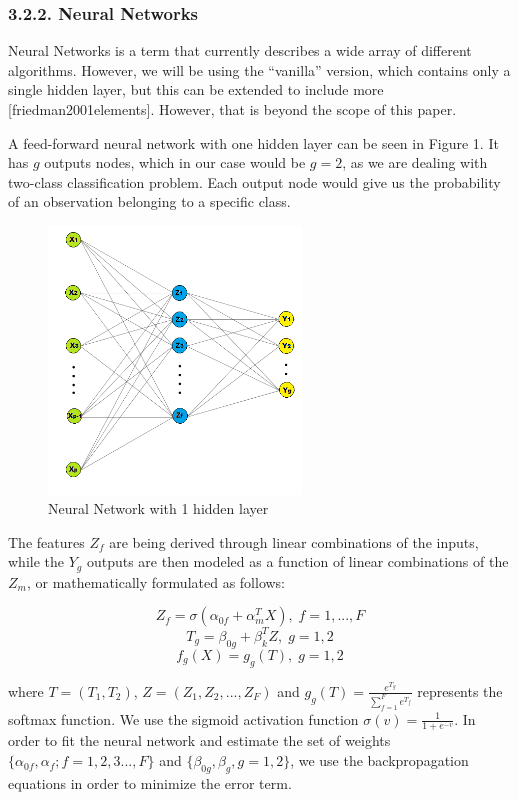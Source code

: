 \documentclass[12pt,]{article}
\begin{document}
\hypertarget{neural-networks}{%
\subsubsection{3.2.2. Neural Networks}\label{neural-networks}}

Neural Networks is a term that currently describes a wide array of
different algorithms. However, we will be using the ``vanilla'' version,
which contains only a single hidden layer, but this can be extended to
include more {[}friedman2001elements{]}. However, that is beyond the
scope of this paper.

A feed-forward neural network with one hidden layer can be seen in
Figure 1. It has \(g\) outputs nodes, which in our case would be
\(g=2\), as we are dealing with two-class classification problem. Each
output node would give us the probability of an observation belonging to
a specific class.

\begin{figure}
\centering
\includegraphics[width=0.6\textwidth,height=\textheight]{figures/nnet.png}
\caption{Neural Network with 1 hidden layer}
\end{figure}

The features \(Z_f\) are being derived through linear combinations of
the inputs, while the \(Y_g\) outputs are then modeled as a function of
linear combinations of the \(Z_m\), or mathematically formulated as
follows:

\[Z_f=\sigma(\alpha_{0f}+\alpha_{m}^{T}X),\;f=1,...,F\]
\[T_g=\beta_{0g}+\beta_{k}^{T}Z,\;g=1,2\] \[f_{g}(X)=g_g(T),\;g=1,2\]

where \(T=(T_1,T_2)\), \(Z=(Z_1,Z_2,...,Z_F)\) and
\(g_g(T)=\frac{e^{T_g}}{\sum_{f=1}^{F}e^{T_f}}\) represents the softmax
function. We use the sigmoid activation function
\(\sigma(v)=\frac{1}{1+e^{-v}}\). In order to fit the neural network and
estimate the set of weights \(\{\alpha_{0f},\alpha_{f};f=1,2,3...,F\}\)
and \(\{\beta_{0g},\beta_{g},g=1,2\}\), we use the backpropagation
equations in order to minimize the error term.
\end{document}
